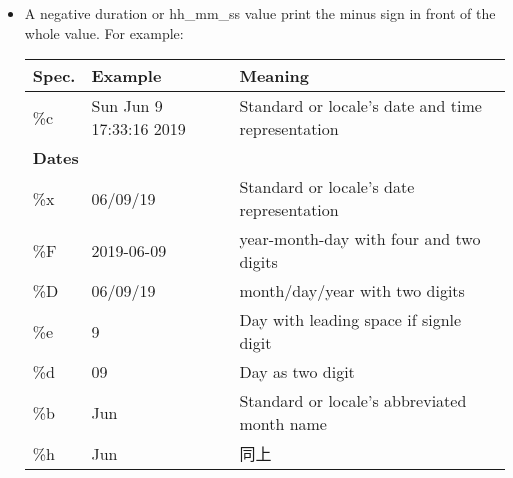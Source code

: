 \begin{itemize}
\item 
A negative duration or hh\_mm\_ss value print the minus sign in front of the whole value. For example:


\begin{longtable}[c]{|lll|}
\hline
\multicolumn{1}{|l|}{\textbf{Spec.}} & \multicolumn{1}{l|}{\textbf{Example}}  & \textbf{Meaning}                                                \\ \hline
\endfirsthead
%
\endhead
%
\multicolumn{1}{|l|}{\%c} & \multicolumn{1}{l|}{Sun Jun  9 17:33:16 2019} & Standard or locale's date and time representation               \\ \hline
\multicolumn{3}{|l|}{\textbf{Dates}}                                                                                                            \\ \hline
\multicolumn{1}{|l|}{\%x}            & \multicolumn{1}{l|}{06/09/19}          & Standard or locale's date representation                        \\ \hline
\multicolumn{1}{|l|}{\%F}            & \multicolumn{1}{l|}{2019-06-09}        & year-month-day with four and two digits                         \\ \hline
\multicolumn{1}{|l|}{\%D}            & \multicolumn{1}{l|}{06/09/19}          & month/day/year with two digits                                  \\ \hline
\multicolumn{1}{|l|}{\%e}            & \multicolumn{1}{l|}{9}                 & Day with leading space if signle digit                          \\ \hline
\multicolumn{1}{|l|}{\%d}            & \multicolumn{1}{l|}{09}                & Day as two digit                                                \\ \hline
\multicolumn{1}{|l|}{\%b}            & \multicolumn{1}{l|}{Jun}               & Standard or locale's abbreviated month name                     \\ \hline
\multicolumn{1}{|l|}{\%h}            & \multicolumn{1}{l|}{Jun}               & 同上                                                              \\ \hline

\end{longtable}
\end{itemize}
